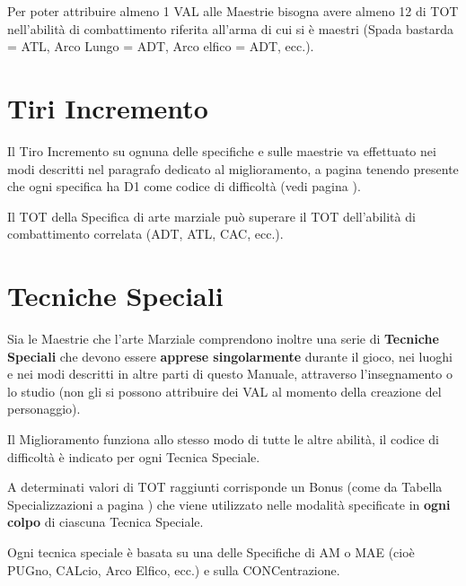 Per poter attribuire almeno 1 VAL alle Maestrie bisogna avere almeno
12 di TOT nell'abilit\`a di combattimento riferita all'arma di cui
si \`e maestri (Spada bastarda = ATL, Arco Lungo = ADT, Arco elfico
= ADT, ecc.).




\section{Tiri Incremento} 

Il Tiro Incremento su ognuna delle specifiche e sulle maestrie va
effettuato nei modi descritti nel paragrafo dedicato al miglioramento,
a pagina \pageref{miglioramento} tenendo presente che ogni specifica
ha D1 come codice di difficolt\`a (vedi pagina
\pageref{tabdifficolta}).

Il TOT della Specifica di arte marziale pu\`o superare il TOT
dell'abilit\`a di combattimento correlata (ADT, ATL, CAC, ecc.).


\section{Tecniche Speciali}

Sia le Maestrie che l'arte Marziale comprendono inoltre una serie di
\textbf{Tecniche Speciali} che devono essere \textbf{apprese
  singolarmente} durante il gioco, nei luoghi e nei modi descritti in
altre parti di questo Manuale, attraverso l'insegnamento o lo studio
(non gli si possono attribuire dei VAL al momento della creazione del
personaggio).

Il Miglioramento funziona allo stesso modo di tutte le altre
abilit\`a, il codice di difficolt\`a \`e indicato per ogni
Tecnica Speciale.

A determinati valori di TOT raggiunti corrisponde un Bonus (come da
Tabella Specializzazioni a pagina \pageref{tabspecializzazioni}) che
viene utilizzato nelle modalit\`a specificate in \textbf{ogni colpo}
di ciascuna Tecnica Speciale.

Ogni tecnica speciale \`e basata su una
delle Specifiche di AM o MAE (cio\`e PUGno, CALcio, Arco Elfico,
ecc.)  e sulla CONCentrazione. 


